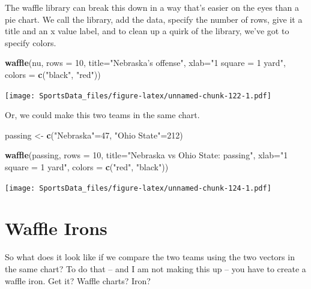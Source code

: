 \documentclass[]{book}
\newenvironment{Shaded}{\begin{snugshade}}{\end{snugshade}}
\newcommand{\DataTypeTok}[1]{\textcolor[rgb]{0.13,0.29,0.53}{#1}}
\newcommand{\DecValTok}[1]{\textcolor[rgb]{0.00,0.00,0.81}{#1}}
\newcommand{\KeywordTok}[1]{\textcolor[rgb]{0.13,0.29,0.53}{\textbf{#1}}}
\newcommand{\NormalTok}[1]{#1}
\newcommand{\StringTok}[1]{\textcolor[rgb]{0.31,0.60,0.02}{#1}}
\begin{document}
The waffle library can break this down in a way that's easier on the eyes than a pie chart. We call the library, add the data, specify the number of rows, give it a title and an x value label, and to clean up a quirk of the library, we've got to specify colors.

\begin{Shaded}
\begin{Highlighting}[]
\KeywordTok{waffle}\NormalTok{(nu, }\DataTypeTok{rows =} \DecValTok{10}\NormalTok{, }\DataTypeTok{title=}\StringTok{"Nebraska's offense"}\NormalTok{, }\DataTypeTok{xlab=}\StringTok{"1 square = 1 yard"}\NormalTok{, }\DataTypeTok{colors =} \KeywordTok{c}\NormalTok{(}\StringTok{"black"}\NormalTok{, }\StringTok{"red"}\NormalTok{))}
\end{Highlighting}
\end{Shaded}

\texttt{[image: SportsData\_files/figure-latex/unnamed-chunk-122-1.pdf]}

Or, we could make this two teams in the same chart.

\begin{Shaded}
\begin{Highlighting}[]
\NormalTok{passing <-}\StringTok{ }\KeywordTok{c}\NormalTok{(}\StringTok{"Nebraska"}\NormalTok{=}\DecValTok{47}\NormalTok{, }\StringTok{"Ohio State"}\NormalTok{=}\DecValTok{212}\NormalTok{)}
\end{Highlighting}
\end{Shaded}

\begin{Shaded}
\begin{Highlighting}[]
\KeywordTok{waffle}\NormalTok{(passing, }\DataTypeTok{rows =} \DecValTok{10}\NormalTok{, }\DataTypeTok{title=}\StringTok{"Nebraska vs Ohio State: passing"}\NormalTok{, }\DataTypeTok{xlab=}\StringTok{"1 square = 1 yard"}\NormalTok{, }\DataTypeTok{colors =} \KeywordTok{c}\NormalTok{(}\StringTok{"red"}\NormalTok{, }\StringTok{"black"}\NormalTok{))}
\end{Highlighting}
\end{Shaded}

\texttt{[image: SportsData\_files/figure-latex/unnamed-chunk-124-1.pdf]}

\hypertarget{waffle-irons}{%
\section{Waffle Irons}\label{waffle-irons}}

So what does it look like if we compare the two teams using the two vectors in the same chart? To do that -- and I am not making this up -- you have to create a waffle iron. Get it? Waffle charts? Iron?
\end{document}

